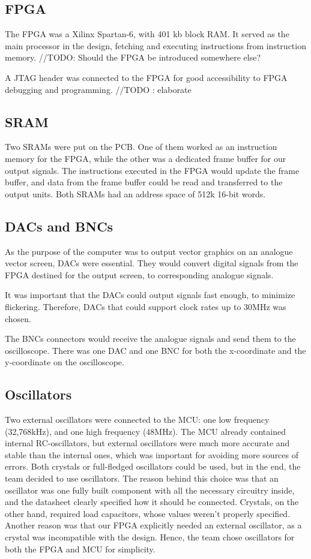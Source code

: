 \subsection{FPGA}
The FPGA was a Xilinx Spartan-6, with 401 kb block RAM. 
It served as the main processor in the design, fetching and executing instructions from instruction memory.
//TODO: Should the FPGA be introduced somewhere else?

A JTAG header was connected to the FPGA for good accessibility to FPGA debugging and programming.
//TODO : elaborate

\subsection{SRAM}
Two SRAMs were put on the PCB. 
One of them worked as an instruction memory for the FPGA, while the other was a dedicated frame buffer for our output signals. 
The instructions executed in the FPGA would update the frame buffer, and data from the frame buffer could be read and transferred to the output units. 
Both SRAMs had an address space of 512k 16-bit words. 

\subsection{DACs and BNCs}
As the purpose of the computer was to output vector graphics on an analogue vector screen, DACs were essential.
They would convert digital signals from the FPGA destined for the output screen, to corresponding analogue signals.

It was important that the DACs could output signals fast enough, to minimize flickering. 
Therefore, DACs that could support clock rates up to 30MHz was chosen.

The BNCs connectors would receive the analogue signals and send them to the oscilloscope.
There was one DAC and one BNC for both the x-coordinate and the y-coordinate on the oscilloscope.

\subsection{Oscillators}
Two external oscillators were connected to the MCU: one low frequency (32,768kHz), and one high frequency (48MHz).
The MCU already contained internal RC-oscillators, but external oscillators were much more accurate and stable than the internal ones, which was important for avoiding more sources of errors.
Both crystals or full-fledged oscillators could be used, but in the end, the team decided to use oscillators.
The reason behind this choice was that an oscillator was one fully built component with all the necessary circuitry inside, and the datasheet clearly specified how it should be connected.
Crystals, on the other hand, required load capacitors, whose values weren't properly specified.
Another reason was that our FPGA explicitly needed an external oscillator, as a crystal was incompatible with the design.
Hence, the team chose oscillators for both the FPGA and MCU for simplicity.

